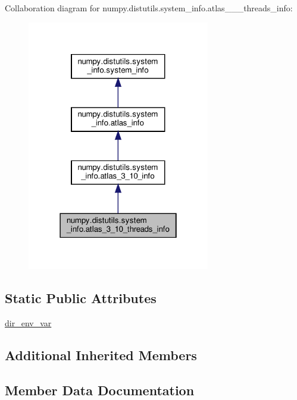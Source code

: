 Collaboration diagram for numpy.\+distutils.\+system\+\_\+info.\+atlas\+\_\+\_\+\_\+threads\+\_\+info\+:
\nopagebreak
\begin{figure}[H]
\begin{center}
\leavevmode
\includegraphics[width=226pt]{classnumpy_1_1distutils_1_1system__info_1_1atlas__3__10__threads__info__coll__graph}
\end{center}
\end{figure}
\subsection*{Static Public Attributes}
\begin{DoxyCompactItemize}
\item 
\hyperlink{classnumpy_1_1distutils_1_1system__info_1_1atlas__3__10__threads__info_aa78435b77731d3e86b4199dc741bdb23}{dir\+\_\+env\+\_\+var}
\end{DoxyCompactItemize}
\subsection*{Additional Inherited Members}


\subsection{Member Data Documentation}
\mbox{\label{classnumpy_1_1distutils_1_1system__info_1_1atlas__3__10__threads__info_aa78435b77731d3e86b4199dc741bdb23}} 
